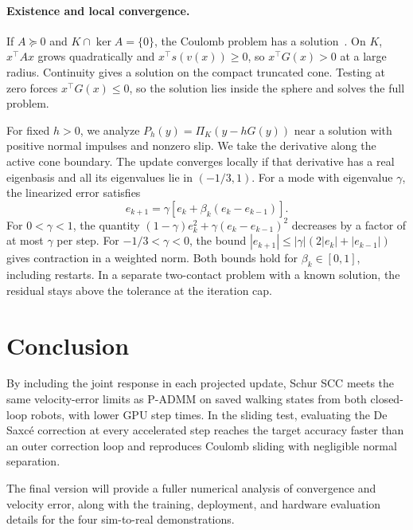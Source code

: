 \documentclass[conference]{IEEEtran}
\begin{document}
\paragraph{Existence and local convergence.} If \(A\succeq0\) and \(K\cap\ker A=\{0\}\), the Coulomb problem has a solution~\citep{acary}. On \(K\), \(x^\top A x\) grows quadratically and \(x^\top s(v(x))\geq0\), so \(x^\top G(x)>0\) at a large radius. Continuity gives a solution on the compact truncated cone. Testing at zero forces \(x^\top G(x)\leq0\), so the solution lies inside the sphere and solves the full problem.

For fixed \(h>0\), we analyze \(P_h(y)=\Pi_K(y-hG(y))\) near a solution with positive normal impulses and nonzero slip. We take the derivative along the active cone boundary. The update converges locally if that derivative has a real eigenbasis and all its eigenvalues lie in \((-1/3,1)\). For a mode with eigenvalue \(\gamma\), the linearized error satisfies
\begin{equation}
 e_{k+1}=\gamma[e_k+\beta_k(e_k-e_{k-1})].
\end{equation}
For \(0<\gamma<1\), the quantity \((1-\gamma)e_k^2+\gamma(e_k-e_{k-1})^2\) decreases by a factor of at most \(\gamma\) per step. For \(-1/3<\gamma<0\), the bound \(|e_{k+1}|\leq|\gamma|(2|e_k|+|e_{k-1}|)\) gives contraction in a weighted norm. Both bounds hold for \(\beta_k\in[0,1]\), including restarts. In a separate two-contact problem with a known solution, the residual stays above the tolerance at the iteration cap.

\section{Conclusion}
By including the joint response in each projected update, Schur SCC meets the same velocity-error limits as P-ADMM on saved walking states from both closed-loop robots, with lower GPU step times. In the sliding test, evaluating the De Saxc\'e correction at every accelerated step reaches the target accuracy faster than an outer correction loop and reproduces Coulomb sliding with negligible normal separation.

The final version will provide a fuller numerical analysis of convergence and velocity error, along with the training, deployment, and hardware evaluation details for the four sim-to-real demonstrations.

\clearpage

\end{document}
